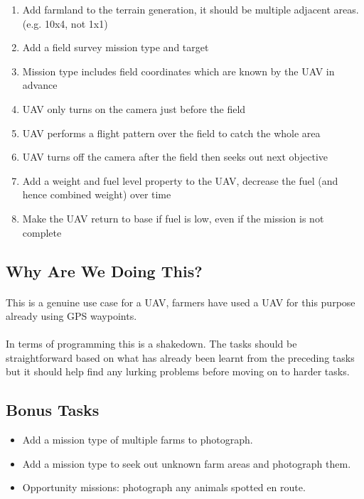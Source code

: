 \documentclass[11pt]{book}
\begin{document}
\begin{enumerate}
\item Add farmland to the terrain generation, it should be multiple adjacent areas. (e.g. 10x4, not 1x1)
\item Add a field survey mission type and target
\item Mission type includes field coordinates which are known by the UAV in advance
\item UAV only turns on the camera just before the field
\item UAV performs a flight pattern over the field to catch the whole area
\item UAV turns off the camera after the field then seeks out next objective
\item Add a weight and fuel level property to the UAV, decrease the fuel (and hence combined weight) over time
\item Make the UAV return to base if fuel is low, even if the mission is not complete
\end{enumerate}

\subsection{Why Are We Doing This?}

\paragraph{} This is a genuine use case for a UAV, farmers have used a UAV for
this purpose already using GPS waypoints.

\paragraph{} In terms of programming this is a shakedown. The tasks should be
straightforward based on what has already been learnt from the preceding tasks
but it should help find any lurking problems before moving on to harder tasks.

\subsection{Bonus Tasks}

\begin{itemize}
\item Add a mission type of multiple farms to photograph.
\item Add a mission type to seek out unknown farm areas and photograph them.
\item Opportunity missions: photograph any animals spotted en route.
\end{itemize}
\end{document}
